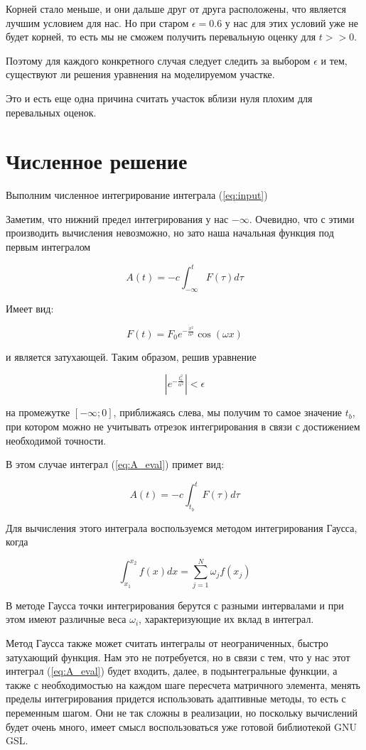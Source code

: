\documentclass[14pt]{extarticle}
\newcommand{\sectionbreak}{\clearpage}
\begin{document}
Корней стало меньше, и они дальше друг от друга расположены, что является лучшим условием для нас. Но при старом $\epsilon = 0.6$ у нас для этих условий уже не будет корней, то есть мы не сможем получить перевальную оценку для $t>>0$.

Поэтому для каждого конкретного случая следует следить за выбором $\epsilon$ и тем, существуют ли решения уравнения на моделируемом участке.

Это и есть еще одна причина считать участок вблизи нуля плохим для перевальных оценок.
\sectionbreak

\section{Численное решение}

Выполним численное интегрирование интеграла (\ref{eq:input})

Заметим, что нижний предел интегрирования у нас $-\infty$. Очевидно, что с этими производить вычисления невозможно, но зато наша начальная функция под первым интегралом

$$
A(t) = -c\int_{-\infty}^{t} F(\tau) d\tau
$$

Имеет вид:

\begin{equation}\label{eq:f}
F(t) =  F_0 e^{ -\frac{x^2}{\alpha^2} }  \cos(\omega x)
\end{equation}

и является затухающей. Таким образом, решив уравнение 

$$
|e^{ -\frac{t_b^2}{\alpha^2} }| < \epsilon
$$

на промежутке $[-\infty; 0]$, приближаясь слева, мы получим то самое значение $t_b$, при котором можно не учитывать отрезок интегрирования в связи с достижением необходимой точности.

В этом случае интеграл (\ref{eq:A_eval}) примет вид:

$$\label{eq:easy}
A(t) = -c\int_{t_b}^{t} F(\tau) d\tau
$$

Для вычисления этого интеграла воспользуемся методом интегрирования Гаусса, когда 

$$
\int_{x_1}^{x_2} f(x) dx = \sum_{j=1}^{N} \omega_j f(x_j)
$$

В методе Гаусса точки интегрирования берутся с разными интервалами и при этом имеют различные веса $\omega_i$, характеризующие их вклад в интеграл.

Метод Гаусса также может считать интегралы от неограниченных, быстро затухающий функция. Нам это не потребуется, но в связи с тем, что у нас этот интеграл (\ref{eq:A_eval}) будет входить, далее, в подынтегральные функции, а также с необходимостью на каждом шаге пересчета матричного элемента, менять пределы интегрирования придется использовать адаптивные методы, то есть с переменным шагом. Они не так сложны в реализации, но поскольку вычислений будет очень много, имеет смысл воспользоваться уже готовой библиотекой GNU GSL. 
\end{document}
